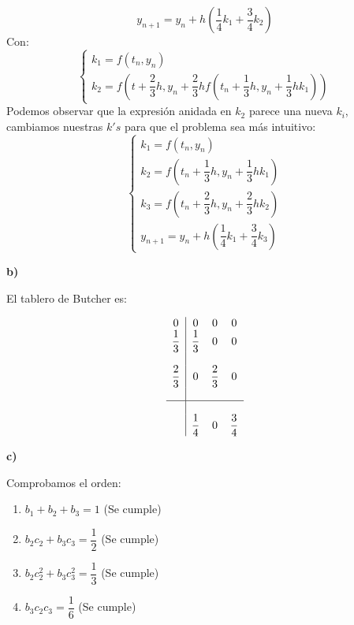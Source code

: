 \documentclass[openany]{book}
\begin{document}
    \setcounter{ex}{9}

    \begin{exercise}
        $$ y_{n+1} = y_n+h(\dfrac{1}{4}k_1+\dfrac{3}{4}k_2) $$
        Con:
        $$ \left\{
        \begin{array}{l}
            k_1 = f(t_n,y_n)\\
            k_2 = f(t+\dfrac{2}{3}h,y_n+\dfrac{2}{3}hf(t_n+\dfrac{1}{3}h,y_n+\dfrac{1}{3}hk_1))
        \end{array}
        \right. $$
        Podemos observar que la expresión anidada en $ k_2 $ parece una nueva $ k_i $, cambiamos nuestras $ k's $ para que el problema sea más intuitivo:
        $$ 
        \left\{
        \begin{array}{l}
            k_1 = f(t_n,y_n)\\
            k_2 = f(t_n+\dfrac{1}{3}h,y_n+\dfrac{1}{3}hk_1)\\
            k_3 = f(t_n+\dfrac{2}{3}h,y_n+\dfrac{2}{3}hk_2)\\
            y_{n+1} = y_n+h(\dfrac{1}{4}k_1+\dfrac{3}{4}k_3)
        \end{array}
        \right.
        $$

        \textbf{b)}

        El tablero de Butcher es:

        $$ 
        \begin{array}{c|ccc}
            0 & 0 & 0 & 0 \\
            \dfrac{1}{3} & \dfrac{1}{3} & 0 & 0\\ \\
            \dfrac{2}{3} & 0 & \dfrac{2}{3} & 0 \\ \\
            \hline \\
            & \dfrac{1}{4} & 0 & \dfrac{3}{4}

        \end{array}
        $$

        \textbf{c)}

        Comprobamos el orden:
        \begin{enumerate}
            \item $ b_1+b_2+b_3 = 1 $ (Se cumple)
            \item $ b_2c_2+b_3c_3 = \dfrac{1}{2} $ (Se cumple)
            \item $ b_2c_2^2+b_3c_3^2 = \dfrac{1}{3} $ (Se cumple)
            \item $ b_3c_2c_3 = \dfrac{1}{6} $ (Se cumple)
        \end{enumerate}


\end{exercise}
\end{document}
